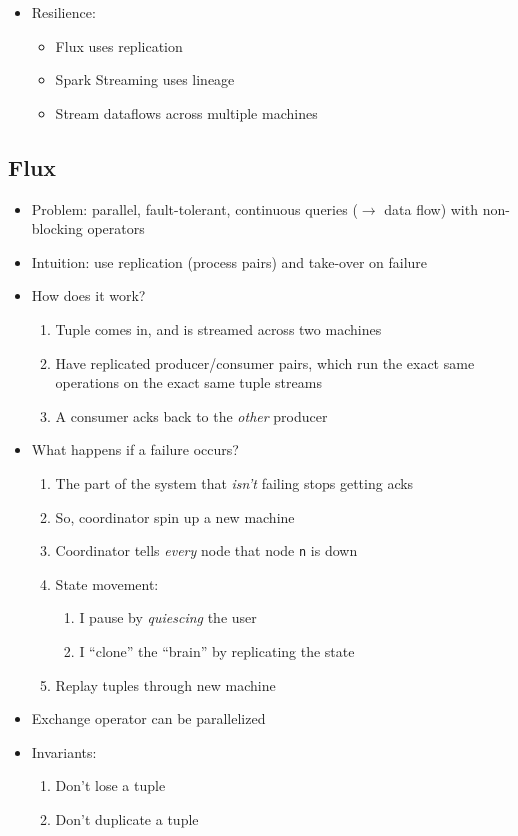 \documentclass[10pt]{article}
\begin{document}
\begin{itemize}
\item Resilience:
\begin{itemize}
\item Flux uses replication
\item Spark Streaming uses lineage
\item Stream dataflows across multiple machines
\end{itemize}
\end{itemize}

\subsection{Flux}

\begin{itemize}
\item Problem: parallel, fault-tolerant, continuous queries ($\rightarrow$ data flow) with non-blocking
operators
\item Intuition: use replication (process pairs) and take-over on failure
\item How does it work?
\begin{enumerate}
\item Tuple comes in, and is streamed across two machines
\item Have replicated producer/consumer pairs, which run the exact same operations on the exact
same tuple streams
\item A consumer acks back to the \emph{other} producer
\end{enumerate}
\item What happens if a failure occurs?
\begin{enumerate}
\item The part of the system that \emph{isn't} failing stops getting acks
\item So, coordinator spin up a new machine
\item Coordinator tells \emph{every} node that node \texttt{n} is down
\item State movement:
\begin{enumerate}
\item I pause by \emph{quiescing} the user
\item I ``clone'' the ``brain'' by replicating the state
\end{enumerate}
\item Replay tuples through new machine
\end{enumerate}
\item Exchange operator can be parallelized
\item Invariants:
\begin{enumerate}
\item Don't lose a tuple
\item Don't duplicate a tuple
\end{enumerate}
\end{itemize}
\end{document}
